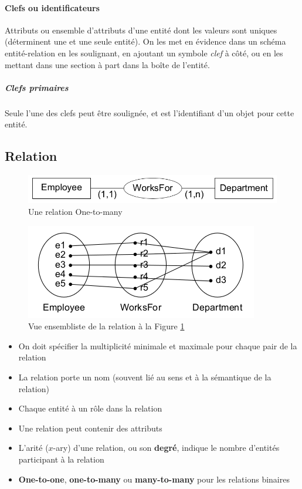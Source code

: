 \documentclass[a4paper]{article}
\begin{document}
\paragraph{Clefs ou identificateurs}
Attributs ou ensemble d'attributs d'une entité dont les valeurs sont uniques
(déterminent une et une seule entité). On les met en évidence dans un schéma
entité-relation en les soulignant, en ajoutant un symbole \textit{clef} à côté,
ou en les mettant dans une section à part dans la boîte de l'entité.
\subparagraph{Clefs primaires}
Seule l'une des clefs peut être soulignée, et est l'identifiant d'un objet pour
cette entité.

\subsection{Relation}
\begin{figure}[H]
    \center
    \includegraphics[width=.4\textwidth]{fig/relation.png}
    \caption{\label{fig:relation}Une relation One-to-many}
\end{figure}
\begin{figure}[H]
    \center
    \includegraphics[width=.3\textwidth]{fig/relation-ensembliste.png}
    \caption{Vue ensembliste de la relation à la Figure \ref{fig:relation}}
\end{figure}
\begin{itemize}
  \item On doit spécifier la multiplicité minimale et maximale pour chaque pair de la relation
  \item La relation porte un nom (souvent lié au sens et à la sémantique de la relation)
  \item Chaque entité à un rôle dans la relation
  \item Une relation peut contenir des attributs
  \item L'arité ($x$-ary) d'une relation, ou son \textbf{degré}, indique le nombre d'entités participant à la relation
  \item \textbf{One-to-one}, \textbf{one-to-many} ou \textbf{many-to-many} pour les relations binaires
\end{itemize}
\end{document}
